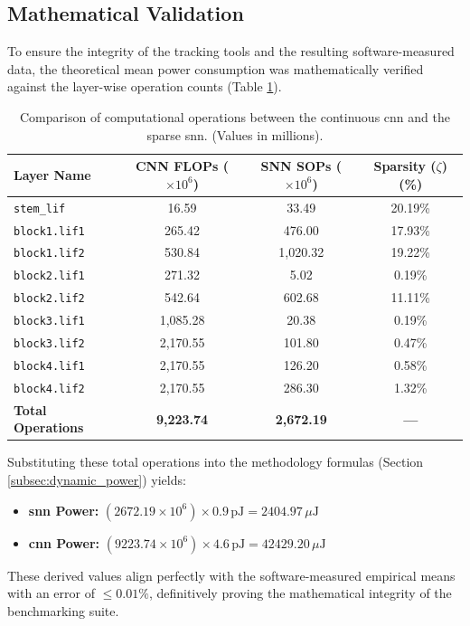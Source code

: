 \clearpage

\subsection*{Mathematical Validation}

To ensure the integrity of the tracking tools and the resulting software-measured data, the theoretical mean power consumption was mathematically verified against the layer-wise operation counts (Table \ref{tab:layer_ops}).

\begin{table}[htbp]
\centering
\begin{tabular}{|l|c|c|c|}
\hline
\textbf{Layer Name} & \textbf{CNN FLOPs ($\times 10^6$)} & \textbf{SNN SOPs ($\times 10^6$)} & \textbf{Sparsity ($\zeta$) (\%)} \\
\hline
\texttt{stem\_lif} & 16.59 & 33.49 & 20.19\% \\
\texttt{block1.lif1} & 265.42 & 476.00 & 17.93\% \\
\texttt{block1.lif2} & 530.84 & 1,020.32 & 19.22\% \\
\texttt{block2.lif1} & 271.32 & 5.02 & 0.19\% \\
\texttt{block2.lif2} & 542.64 & 602.68 & 11.11\% \\
\texttt{block3.lif1} & 1,085.28 & 20.38 & 0.19\% \\
\texttt{block3.lif2} & 2,170.55 & 101.80 & 0.47\% \\
\texttt{block4.lif1} & 2,170.55 & 126.20 & 0.58\% \\
\texttt{block4.lif2} & 2,170.55 & 286.30 & 1.32\% \\
\hline
\textbf{Total Operations} & \textbf{9,223.74} & \textbf{2,672.19} & \textbf{---} \\
\hline
\end{tabular}
\caption[Layer-Wise Operations Comparison]{Comparison of computational operations between the continuous \gls{cnn} and the sparse \gls{snn}. (Values in millions).}
\label{tab:layer_ops}
\end{table}

Substituting these total operations into the methodology formulas (Section \ref{subsec:dynamic_power}) yields:

\begin{itemize}
    \item \textbf{\gls{snn} Power:} $(2672.19\times 10^6) \times 0.9\,\text{pJ} = 2404.97\,\mu\text{J}$
    \item \textbf{\gls{cnn} Power:} $(9223.74 \times 10^6) \times 4.6\,\text{pJ} = 42429.20\,\mu\text{J}$
\end{itemize}

These derived values align perfectly with the software-measured empirical means with an error of $\le 0.01\%$,
definitively proving the mathematical integrity of the benchmarking suite.
